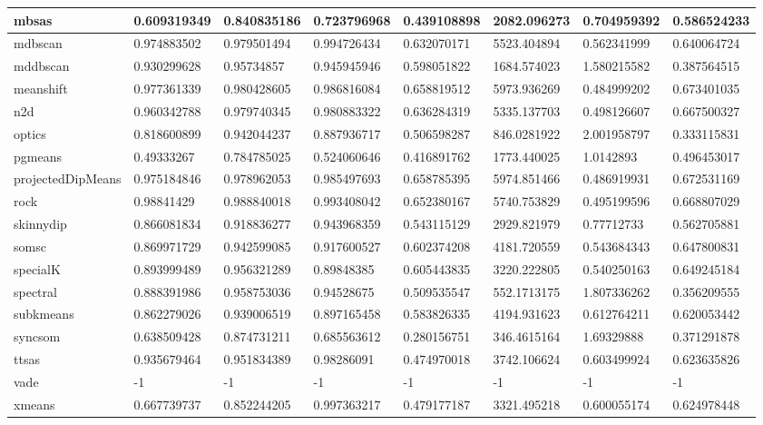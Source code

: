 \begin{table}[H]
\begin{tabular}{|l|l|l|l|l|l|l|l|}
\hline
mbsas & 0.609319349 & 0.840835186 & 0.723796968 & 0.439108898 & 2082.096273 & 0.704959392 & 0.586524233 \\
\hline
mdbscan & 0.974883502 & 0.979501494 & 0.994726434 & 0.632070171 & 5523.404894 & 0.562341999 & 0.640064724 \\
\hline
mddbscan & 0.930299628 & 0.95734857 & 0.945945946 & 0.598051822 & 1684.574023 & 1.580215582 & 0.387564515 \\
\hline
meanshift & 0.977361339 & 0.980428605 & 0.986816084 & 0.658819512 & 5973.936269 & 0.484999202 & 0.673401035 \\
\hline
n2d & 0.960342788 & 0.979740345 & 0.980883322 & 0.636284319 & 5335.137703 & 0.498126607 & 0.667500327 \\
\hline
optics & 0.818600899 & 0.942044237 & 0.887936717 & 0.506598287 & 846.0281922 & 2.001958797 & 0.333115831 \\
\hline
pgmeans & 0.49333267 & 0.784785025 & 0.524060646 & 0.416891762 & 1773.440025 & 1.0142893 & 0.496453017 \\
\hline
projectedDipMeans & 0.975184846 & 0.978962053 & 0.985497693 & 0.658785395 & 5974.851466 & 0.486919931 & 0.672531169 \\
\hline
rock & 0.98841429 & 0.988840018 & 0.993408042 & 0.652380167 & 5740.753829 & 0.495199596 & 0.668807029 \\
\hline
skinnydip & 0.866081834 & 0.918836277 & 0.943968359 & 0.543115129 & 2929.821979 & 0.77712733 & 0.562705881 \\
\hline
somsc & 0.869971729 & 0.942599085 & 0.917600527 & 0.602374208 & 4181.720559 & 0.543684343 & 0.647800831 \\
\hline
specialK & 0.893999489 & 0.956321289 & 0.89848385 & 0.605443835 & 3220.222805 & 0.540250163 & 0.649245184 \\
\hline
spectral & 0.888391986 & 0.958753036 & 0.94528675 & 0.509535547 & 552.1713175 & 1.807336262 & 0.356209555 \\
\hline
subkmeans & 0.862279026 & 0.939006519 & 0.897165458 & 0.583826335 & 4194.931623 & 0.612764211 & 0.620053442 \\
\hline
syncsom & 0.638509428 & 0.874731211 & 0.685563612 & 0.280156751 & 346.4615164 & 1.69329888 & 0.371291878 \\
\hline
ttsas & 0.935679464 & 0.951834389 & 0.98286091 & 0.474970018 & 3742.106624 & 0.603499924 & 0.623635826 \\
\hline
vade & -1 & -1 & -1 & -1 & -1 & -1 & -1 \\
\hline
xmeans & 0.667739737 & 0.852244205 & 0.997363217 & 0.479177187 & 3321.495218 & 0.600055174 & 0.624978448 \\
\hline
\end{tabular}
\end{table}

